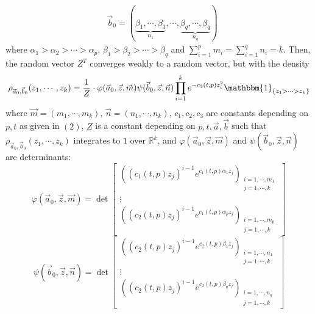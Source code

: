 \begin{enumerate}
\begin{align*}
	&\vec{b}_{0}=(\underbrace{\beta_{1},\cdots,\beta_{1}}_{n_{1}},\cdots,\underbrace{\beta_{q},\cdots,\beta_{q}}_{n_{q}})
	\end{align*}
where $\alpha_{1}>\alpha_{2}>\cdots>\alpha_{p}$, $\beta_{1}>\beta_{2}>\cdots>\beta_{q}$ and $\sum_{i=1}^{p}m_{i}=\sum_{i=1}^{q}n_{i}=k$. Then, the random vector $Z^{T}$ converges weakly to a random vector, but with the density $$\rho_{\vec{a}_{0},\vec{b}_{0}}(z_{1},\cdots,z_{k})=\frac{1}{Z}\cdot \varphi(\vec{a}_{0},\vec{z},\vec{m})\psi(\vec{b}_{0},\vec{z},\vec{n})\prod_{i=1}^{k}e^{-c_{3}(t,p)z_{i}^{2}}\mathbbm{1}_{\{z_{1}>\cdots> z_{k}\}}$$ where $\vec{m}=(m_{1},\cdots,m_{k})$, $\vec{n}=(n_{1},\cdots,n_{k})$, $c_{1},c_{2},c_{3}$ are constants depending on $p,t$ as given in $(2)$, $Z$ is a constant depending on $p,t,\vec{a},\vec{b}$ such that $\rho_{\vec{a}_{0},\vec{b}_{0}}(z_{1},\cdots,z_{k})$ integrates to $1$ over $\mathbb{R}^{k}$, and $\varphi(\vec{a}_{0},\vec{z},\vec{m})$ and $\psi(\vec{b}_{0},\vec{z},\vec{n})$ are determinants:
\begin{equation*}
	\varphi(\vec{a}_{0},\vec{z},\vec{m})= \det
	\left[ \begin{array}{ccc}
		((c_{1}(t,p)z_{j})^{i-1}e^{c_{1}(t,p)\alpha_{1}z_{j}})_{\substack{i=1,\cdots,m_{1}\\j=1,\cdots,k}}\\
	\vdots\\
	((c_{2}(t,p)z_{j})^{i-1}e^{c_{1}(t,p)\alpha_{p}z_{j}})_{\substack{i=1,\cdots,m_{p} \\j=1,\cdots,k}}
	\end{array}
	\right]
\end{equation*}
\begin{equation*}
	\psi(\vec{b}_{0},\vec{z},\vec{n})= \det
	\left[ \begin{array}{ccc}
		((c_{2}(t,p)z_{j})^{i-1}e^{c_{2}(t,p)\beta_{1}z_{j}})_{\substack{i=1,\cdots,n_{1}\\j=1,\cdots,k}}\\
	\vdots\\
	((c_{2}(t,p)z_{j})^{i-1}e^{c_{2}(t,p)\beta_{q}z_{j}})_{\substack{i=1,\cdots, n_{q} \\j=1,\cdots,k}}
	\end{array}
	\right]
\end{equation*} 
\end{enumerate}
